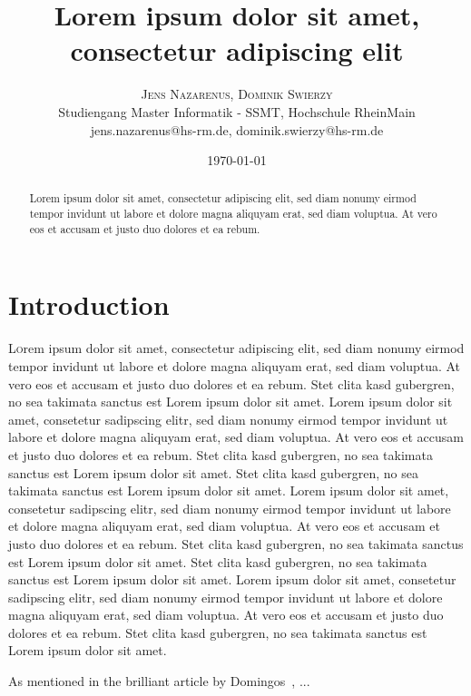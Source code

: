 \documentclass[twoside,twocolumn]{article}
\title{\vspace{-7mm}%
	\fontsize{24pt}{10pt}\selectfont
	\textbf{Lorem ipsum dolor sit amet, consectetur adipiscing elit}
	}
\author{%
	\large
	\textsc{Jens Nazarenus, Dominik Swierzy} \\[2mm]
	\normalsize	Studiengang Master Informatik - SSMT, Hochschule RheinMain \\
	\normalsize	jens.nazarenus@hs-rm.de, dominik.swierzy@hs-rm.de
	}
\date{\today}
\begin{document}
\maketitle
\thispagestyle{fancy}

\begin{abstract}
Lorem ipsum dolor sit amet, consectetur adipiscing elit, sed diam nonumy eirmod tempor invidunt ut labore et dolore magna aliquyam erat, sed diam voluptua. At vero eos et accusam et justo duo dolores et ea rebum.
\end{abstract}

\section{Introduction}
\lettrine[nindent=0em,lines=3]{L} orem ipsum dolor sit amet, consectetur adipiscing elit, sed diam nonumy eirmod tempor invidunt ut labore et dolore magna aliquyam erat, sed diam voluptua. At vero eos et accusam et justo duo dolores et ea rebum. Stet clita kasd gubergren, no sea takimata sanctus est Lorem ipsum dolor sit amet. Lorem ipsum dolor sit amet, consetetur sadipscing elitr, sed diam nonumy eirmod tempor invidunt ut labore et dolore magna aliquyam erat, sed diam voluptua. At vero eos et accusam et justo duo dolores et ea rebum. Stet clita kasd gubergren, no sea takimata sanctus est Lorem ipsum dolor sit amet.
Stet clita kasd gubergren, no sea takimata sanctus est Lorem ipsum dolor sit amet. Lorem ipsum dolor sit amet, consetetur sadipscing elitr, sed diam nonumy eirmod tempor invidunt ut labore et dolore magna aliquyam erat, sed diam voluptua. At vero eos et accusam et justo duo dolores et ea rebum. Stet clita kasd gubergren, no sea takimata sanctus est Lorem ipsum dolor sit amet.
Stet clita kasd gubergren, no sea takimata sanctus est Lorem ipsum dolor sit amet. Lorem ipsum dolor sit amet, consetetur sadipscing elitr, sed diam nonumy eirmod tempor invidunt ut labore et dolore magna aliquyam erat, sed diam voluptua. At vero eos et accusam et justo duo dolores et ea rebum. Stet clita kasd gubergren, no sea takimata sanctus est Lorem ipsum dolor sit amet.

As mentioned in the brilliant article by Domingos~\cite{domingos12ml}, ...





\end{document}
